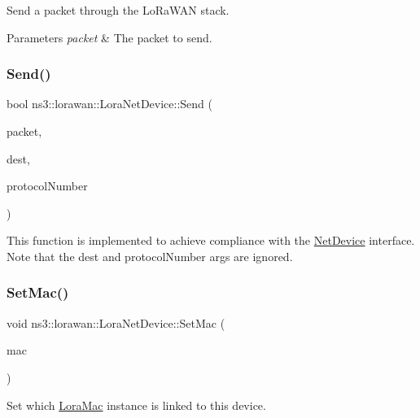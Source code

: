 Send a packet through the Lo\+Ra\+W\+AN stack.


\begin{DoxyParams}{Parameters}
{\em packet} & The packet to send. \\
\hline
\end{DoxyParams}
\mbox{\label{classns3_1_1lorawan_1_1LoraNetDevice_a4536a51a4f690c41f015675c827e70d3}} 
\subsubsection{\texorpdfstring{Send()}{Send()}\hspace{0.1cm}{\footnotesize\ttfamily [2/2]}}
{\footnotesize\ttfamily bool ns3\+::lorawan\+::\+Lora\+Net\+Device\+::\+Send (\begin{DoxyParamCaption}\item[{Ptr$<$ Packet $>$}]{packet,  }\item[{const Address \&}]{dest,  }\item[{uint16\+\_\+t}]{protocol\+Number }\end{DoxyParamCaption})}

This function is implemented to achieve compliance with the \hyperlink{classNetDevice}{Net\+Device} interface. Note that the dest and protocol\+Number args are ignored. \mbox{\label{classns3_1_1lorawan_1_1LoraNetDevice_a6d0981324a56eaf1fe6f23b0f5b1b8b9}} 
\subsubsection{\texorpdfstring{Set\+Mac()}{SetMac()}}
{\footnotesize\ttfamily void ns3\+::lorawan\+::\+Lora\+Net\+Device\+::\+Set\+Mac (\begin{DoxyParamCaption}\item[{Ptr$<$ \hyperlink{classns3_1_1lorawan_1_1LoraMac}{Lora\+Mac} $>$}]{mac }\end{DoxyParamCaption})}

Set which \hyperlink{classns3_1_1lorawan_1_1LoraMac}{Lora\+Mac} instance is linked to this device.


